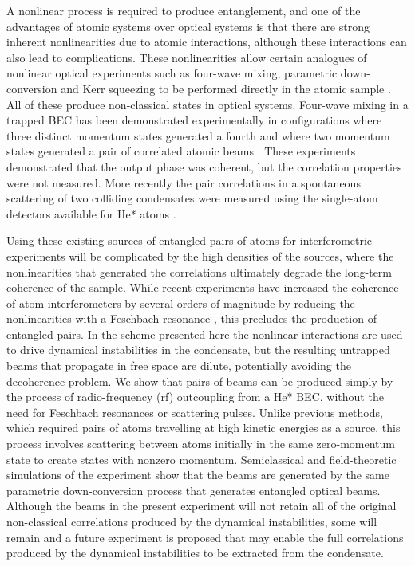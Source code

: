 A nonlinear process is required to produce entanglement, and one of the advantages of atomic systems over optical systems is that there are strong inherent nonlinearities due to atomic interactions, although these interactions can also lead to complications. These nonlinearities allow certain analogues of nonlinear optical experiments such as four-wave mixing, parametric down-conversion and Kerr squeezing to be performed directly in the atomic sample \citep{WallsMilburn}. All of these produce non-classical states in optical systems. Four-wave mixing in a trapped BEC has been demonstrated experimentally in configurations where three distinct momentum states generated a fourth \citep{Deng:1999qy} and where two momentum states generated a pair of correlated atomic beams \citep{Vogels:2002}. These experiments demonstrated that the output phase was coherent, but the correlation properties were not measured. More recently the pair correlations in a spontaneous scattering of two colliding condensates were measured using the single-atom detectors available for He* atoms \citep{Perrin:2007}.

Using these existing sources of entangled pairs of atoms for interferometric experiments will be complicated by the high densities of the sources, where the nonlinearities that generated the correlations ultimately degrade the long-term coherence of the sample. While recent experiments have increased the coherence of atom interferometers by several orders of magnitude by reducing the nonlinearities with a Feschbach resonance \citep{Fattori:2008,Gustavsson:2008}, this precludes the production of entangled pairs.  In the scheme presented here the nonlinear interactions are used to drive dynamical instabilities in the condensate, but the resulting untrapped beams that propagate in free space are dilute, potentially avoiding the decoherence problem.  We show that pairs of beams can be produced simply by the process of radio-frequency (rf) outcoupling from a He* BEC, without the need for Feschbach resonances or scattering pulses.  Unlike previous methods, which required pairs of atoms travelling at high kinetic energies as a source, this process involves scattering between atoms initially in the same zero-momentum state to create states with nonzero momentum.  Semiclassical and field-theoretic simulations of the experiment show that the beams are generated by the same parametric down-conversion process that generates entangled optical beams.  Although the beams in the present experiment will not retain all of the original non-classical correlations produced by the dynamical instabilities, some will remain and a future experiment is proposed that may enable the full correlations produced by the dynamical instabilities to be extracted from the condensate.

